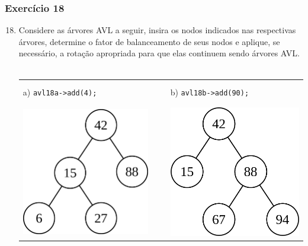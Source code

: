 \documentclass[aspectratio=169]{beamer}
\begin{document}
\begin{frame}[fragile]\frametitle{Exercício 18}
\begin{enumerate}
	\setcounter{enumi}{17}
	\item Considere as árvores AVL a seguir, insira os nodos indicados nas respectivas árvores, determine o fator de balanceamento de seus nodos e aplique, se necessário, a rotação apropriada para que elas continuem sendo árvores AVL.\\~\\
\begin{tabular}{lll}
a) \texttt{avl18a->add(4);}& ~ ~ & b) \texttt{avl18b->add(90);}\\
\includegraphics[height=0.3\paperheight]{imagens/avl15.png} & ~ ~ &
\includegraphics[height=0.3\paperheight]{imagens/avl16.png} \\

\end{tabular}
\end{enumerate}
\end{frame}
\end{document}

